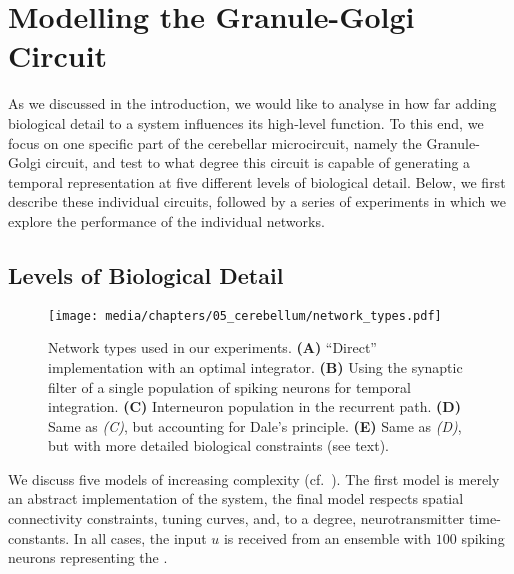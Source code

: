 
\section{Modelling the Granule-Golgi Circuit}
\label{sec:cerebellum_golgi_granule}

As we discussed in the introduction, we would like to analyse in how far adding biological detail to a system influences its high-level function.
To this end, we focus on one specific part of the cerebellar microcircuit, namely the Granule-Golgi circuit, and test to what degree this circuit is capable of generating a temporal representation at five different levels of biological detail.
Below, we first describe these individual circuits, followed by a series of experiments in which we explore the performance of the individual networks.

\subsection{Levels of Biological Detail}
\label{sec:cerebellum_levels}

\begin{figure}
	\centering
	\texttt{[image: media/chapters/05\_cerebellum/network\_types.pdf]}%
	{\label{fig:cerebellum_network_types_a}}%
	{\label{fig:cerebellum_network_types_b}}%
	{\label{fig:cerebellum_network_types_c}}%
	{\label{fig:cerebellum_network_types_d}}%
	{\label{fig:cerebellum_network_types_e}}%
	\caption[Network types used in the cerebellum experiments]{Network types used in our experiments. \textbf{(A)} \enquote{Direct} implementation with an optimal integrator. \textbf{(B)} Using the synaptic filter of a single population of spiking neurons for temporal integration. \textbf{(C)} Interneuron population in the recurrent path. \textbf{(D)} Same as \emph{(C)}, but accounting for Dale's principle. \textbf{(E)} Same as \emph{(D)}, but with more detailed biological constraints (see text).}
	\label{fig:cerebellum_network_types}
\end{figure}

We discuss five models of increasing complexity (cf.~).
The first model is merely an abstract implementation of the \LDN system, the final model respects spatial connectivity constraints, tuning curves, and, to a degree, neurotransmitter time-constants.
In all cases, the input $u$ is received from an \NEF ensemble with $100$ spiking \LIF neurons representing the \PCN.

